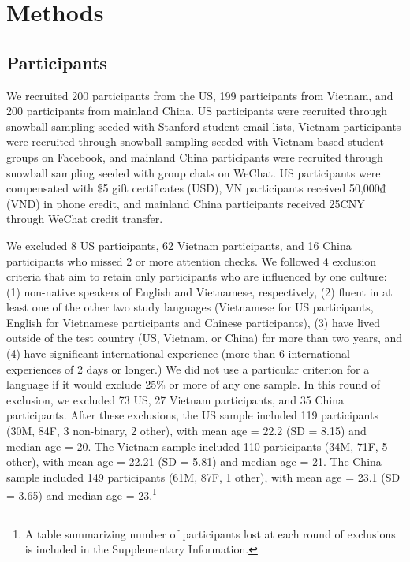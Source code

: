 \documentclass[10pt, letterpaper]{article}
\begin{document}
\hypertarget{methods}{%
\section{Methods}\label{methods}}

\hypertarget{participants}{%
\subsection{Participants}\label{participants}}

We recruited 200 participants from the US, 199 participants from
Vietnam, and 200 participants from mainland China. US participants were
recruited through snowball sampling seeded with Stanford student email
lists, Vietnam participants were recruited through snowball sampling
seeded with Vietnam-based student groups on Facebook, and mainland China
participants were recruited through snowball sampling seeded with group
chats on WeChat. US participants were compensated with \$5 gift
certificates (USD), VN participants received 50,000₫ (VND) in phone
credit, and mainland China participants received 25CNY through WeChat
credit transfer.

We excluded 8 US participants, 62 Vietnam participants, and 16 China
participants who missed 2 or more attention checks. We followed 4
exclusion criteria that aim to retain only participants who are
influenced by one culture: (1) non-native speakers of English and
Vietnamese, respectively, (2) fluent in at least one of the other two
study languages (Vietnamese for US participants, English for Vietnamese
participants and Chinese participants), (3) have lived outside of the
test country (US, Vietnam, or China) for more than two years, and (4)
have significant international experience (more than 6 international
experiences of 2 days or longer.) We did not use a particular criterion
for a language if it would exclude 25\% or more of any one sample. In
this round of exclusion, we excluded 73 US, 27 Vietnam participants, and
35 China participants. After these exclusions, the US sample included
119 participants (30M, 84F, 3 non-binary, 2 other), with mean age = 22.2
(SD = 8.15) and median age = 20. The Vietnam sample included 110
participants (34M, 71F, 5 other), with mean age = 22.21 (SD = 5.81) and
median age = 21. The China sample included 149 participants (61M, 87F, 1
other), with mean age = 23.1 (SD = 3.65) and median age = 23.\footnote{A
  table summarizing number of participants lost at each round of
  exclusions is included in the Supplementary Information.}
\end{document}
